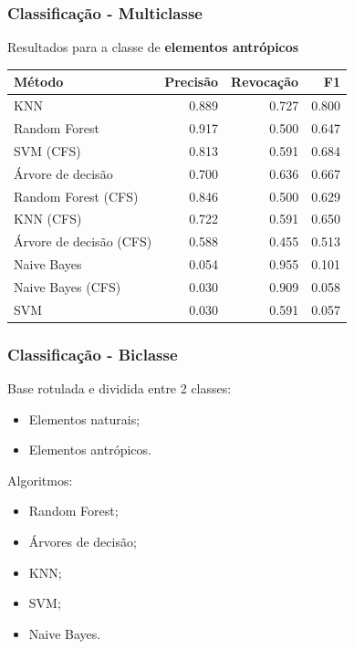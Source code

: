 \documentclass[t]{beamer}
\begin{document}
\begin{frame}[c]
	\frametitle{Classificação - Multiclasse}

	\centering
	Resultados para a classe de \textbf{elementos antrópicos}

	\small{
		\begin{table}[h]
		\centering
		\begin{tabulary}{\linewidth}{|L|R|R|R|}
		\hline
		\textbf{Método} & \textbf{Precisão} & \textbf{Revocação} & \textbf{F1} \\ \hline
		KNN                     & 0.889 & 0.727 & 0.800 \\ \hline
		Random Forest           & 0.917 & 0.500 & 0.647 \\ \hline
		SVM (CFS)               & 0.813 & 0.591 & 0.684 \\ \hline
		Árvore de decisão       & 0.700 & 0.636 & 0.667 \\ \hline
		Random Forest (CFS)     & 0.846 & 0.500 & 0.629 \\ \hline
		KNN (CFS)               & 0.722 & 0.591 & 0.650 \\ \hline
		Árvore de decisão (CFS) & 0.588 & 0.455 & 0.513 \\ \hline
		Naive Bayes             & 0.054 & 0.955 & 0.101 \\ \hline
		Naive Bayes (CFS)       & 0.030 & 0.909 & 0.058 \\ \hline
		SVM                     & 0.030 & 0.591 & 0.057 \\ \hline
		\end{tabulary}
		\end{table}
	}
\end{frame}


\begin{frame}[c]
	\frametitle{Classificação - Biclasse}

	Base rotulada e dividida entre 2 classes:
	\vspace{0.3cm}
	\begin{itemize}
		\item Elementos naturais;
		\item Elementos antrópicos.
	\end{itemize}

	\vspace{0.5cm}

	Algoritmos:
	\begin{itemize}
		\item Random Forest;
		\item Árvores de decisão;
		\item KNN;
		\item SVM;
		\item Naive Bayes.
	\end{itemize}

\end{frame}
\end{document}
